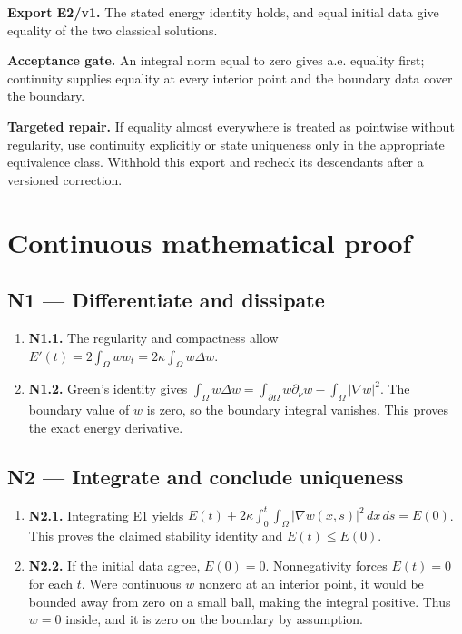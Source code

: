 \documentclass[preprint,12pt,aps,pra,showkeys,amsmath,amssymb,superscriptaddress,floatfix]{revtex4-2}
\theoremstyle{definition}
\theoremstyle{remark}
\newcommand{\field}[2]{\par\smallskip\noindent\textbf{#1.} #2\par}
\begin{document}
\field{Export E2/v1}{The stated energy identity holds, and equal initial data give equality
of the two classical solutions.}

\field{Acceptance gate}{An integral norm equal to zero gives a.e. equality first; continuity
supplies equality at every interior point and the boundary data cover
the boundary.}

\field{Targeted repair}{If equality almost everywhere is treated as pointwise without
regularity, use continuity explicitly or state uniqueness only in the
appropriate equivalence class. Withhold this export and recheck its
descendants after a versioned correction.}

\endgroup\clearpage\section{Continuous mathematical proof}\label{sec:proof}

\subsection{N1 --- Differentiate and
dissipate}\label{n1-differentiate-and-dissipate}

\begin{enumerate}
\def\labelenumi{\arabic{enumi}.}
\item
  \textbf{N1.1.} The regularity and compactness allow
  \(E'(t)=2\int_\Omega w w_t=2\kappa\int_\Omega w\Delta w\).
\item
  \textbf{N1.2.} Green's identity gives
  \(\int_\Omega w\Delta w=\int_{\partial\Omega}w\partial_\nu w-\int_\Omega|\nabla w|^2\).
  The boundary value of \(w\) is zero, so the boundary integral
  vanishes. This proves the exact energy derivative.
\end{enumerate}

\subsection{N2 --- Integrate and conclude
uniqueness}\label{n2-integrate-and-conclude-uniqueness}

\begin{enumerate}
\def\labelenumi{\arabic{enumi}.}
\item
  \textbf{N2.1.} Integrating E1 yields
  \(E(t)+2\kappa\int_0^t\int_\Omega|\nabla w(x,s)|^2\,dx\,ds=E(0)\).
  This proves the claimed stability identity and \(E(t)\le E(0)\).
\item
  \textbf{N2.2.} If the initial data agree, \(E(0)=0\). Nonnegativity
  forces \(E(t)=0\) for each \(t\). Were continuous \(w\) nonzero at an
  interior point, it would be bounded away from zero on a small ball,
  making the integral positive. Thus \(w=0\) inside, and it is zero on
  the boundary by assumption.
\end{enumerate}
\end{document}
